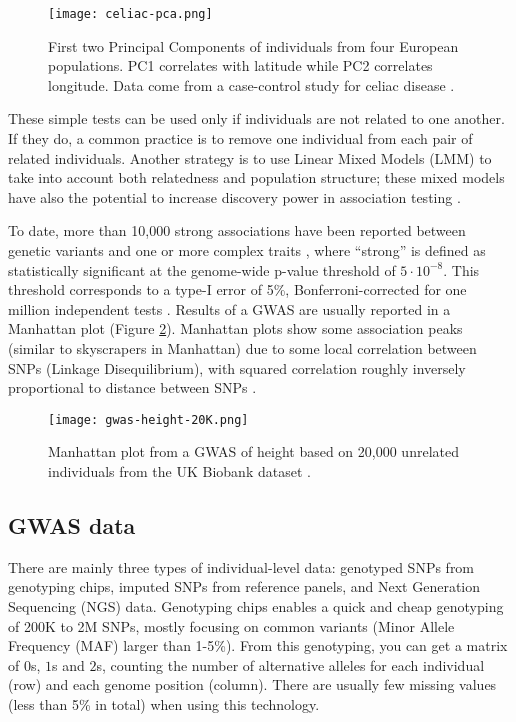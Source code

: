 \begin{figure}[htb]
\centerline{\texttt{[image: celiac-pca.png]}}
\caption{First two Principal Components of individuals from four European populations. PC1 correlates with latitude while PC2 correlates longitude. Data come from a case-control study for celiac disease \cite[]{dubois2010multiple}.}\label{fig:pca}
\end{figure}

These simple tests can be used only if individuals are not related to one another. If they do, a common practice is to remove one individual from each pair of related individuals. Another strategy is to use Linear Mixed Models (LMM) to take into account both relatedness and population structure; these mixed models have also the potential to increase discovery power in association testing \cite[]{yang2014advantages}.

To date, more than 10,000 strong associations have been reported between genetic variants and one or more complex traits \cite[]{welter2013nhgri}, where ``strong'' is defined as statistically significant at the genome-wide p-value threshold of $5 \cdot 10^{-8}$. This threshold corresponds to a type-I error of 5\%, Bonferroni-corrected for one million independent tests \cite[]{pe2008estimation}. Results of a GWAS are usually reported in a Manhattan plot (Figure \ref{fig:gwas}). 
Manhattan plots show some association peaks (similar to skyscrapers in Manhattan) due to some local correlation between SNPs (Linkage Disequilibrium), with squared correlation roughly inversely proportional to distance between SNPs \cite[]{hudson2001two}.

\begin{figure}[htb]
\centerline{\texttt{[image: gwas-height-20K.png]}}
\caption{Manhattan plot from a GWAS of height based on 20,000 unrelated individuals from the UK Biobank dataset \cite[]{bycroft2017genome}.}\label{fig:gwas}
\end{figure}


\subsection{GWAS data}

There are mainly three types of individual-level data: genotyped SNPs from genotyping chips, imputed SNPs from reference panels, and Next Generation Sequencing (NGS) data.
Genotyping chips enables a quick and cheap genotyping of 200K to 2M SNPs, mostly focusing on common variants (Minor Allele Frequency (MAF) larger than 1-5\%). From this genotyping, you can get a matrix of $0$s, $1$s and $2$s, counting the number of alternative alleles for each individual (row) and each genome position (column). There are usually few missing values (less than 5\% in total) when using this technology.

